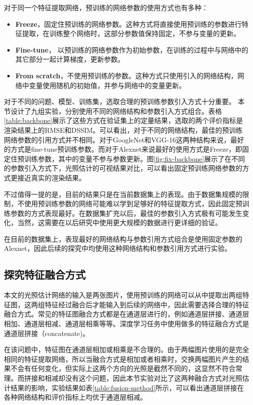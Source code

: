 
对于同一个特征提取网络，预训练的网络参数的使用方式也有多种：
\begin{itemize}
    \item \textbf{Freeze}，固定住预训练的网络参数。这种方式将直接使用预训练的参数进行特征提取，在训练整个网络时，这部分参数值保持固定，不参与变量的更新。
    \item \textbf{Fine-tune}， 以预训练的网络参数作为初始参数，在训练的过程中与网络中的其它部分一起计算梯度，更新参数。
    \item \textbf{From scratch}，不使用预训练的参数。这种方式只使用引入的网络结构，网络中变量使用随机的初始值，并参与网络中的变量更新。
\end{itemize}

对于不同的问题、模型、训练集，选取合理的预训练参数引入方式十分重要。
本节设计了九组实验，分别使用不同的网络结构和参数引入方式组合。表格\ref{table:backbone}展示了这些方式在验证集上的定量结果，选取的两个评价指标是渲染结果上的RMSE和DSSIM。可以看出，对于不同的网络结构，最佳的预训练网络参数的引用方式并不相同。对于GoogleNet和VGG-16这两种结构来说，最好的方式是fine-tune预训练参数。而对于Alexnet来说最好的使用方式是Freeze，即固定住预训练参数，其中的变量不参与参数更新。图\ref{fig:fix-backbone}展示了在不同的参数引入方式下，光照估计的可视结果对比，可以看出固定预训练网络参数的方式更接近真实的渲染结果。


不过值得一提的是，目前的结果只是在当前数据集上的表现。由于数据集规模的限制，不使用预训练参数的网络可能难以学到足够好的特征提取方式，因此固定预训练参数的方式表现最好。在数据集扩充以后，最佳的参数引入方式极有可能发生变化，当然，这需要在以后研究中使用更大规模的数据进行更详细的验证。

在目前的数据集上，表现最好的网络结构与参数引用方式组合是使用固定参数的Alexnet，因此后续的探究中均使用这种网络结构和参数引用方式进行实验。
\subsection{探究特征融合方式}

本文的光照估计网络的输入是两张图片，使用预训练的网络可以从中提取出两组特征图，这两组特征经过融合后才能输入到后续的网络中，因此需要选择合理的特征融合方式。常见的特征图融合方式都是在通道层进行的，例如通道层拼接、通道层相加、通道层相减、通道层相乘等等。深度学习任务中使用做多的特征融合方式是通道层拼接（concatenate)。

在该问题中，特征图在通道层相加或相乘是不合理的。由于两幅图片使用的是完全相同的特征提取网络，所以当融合方式是相加或者相乘时，交换两幅图片产生的结果不会有任何变化，但实际上这两个方向的光照是截然不同的，这显然不符合常理。而拼接和相减却没有这个问题，因此本节实验对比了这两种融合方式对光照估计结果的影响，实验结果如表\ref{table:fusion-method}所示，可以看出通道层拼接在各种网络结构和评价指标上均优于通道层相减。


